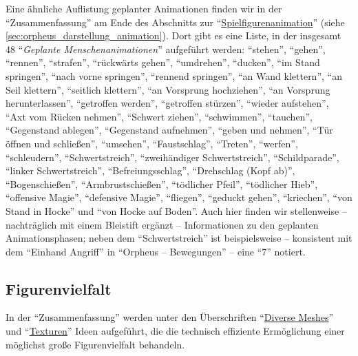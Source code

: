\documentclass[a5paper,pagesize,numbers=noenddot]{scrbook}
\begin{document}
Eine ähnliche Auflistung geplanter Animationen finden wir in der \enquote{Zusammenfassung} am Ende des Abschnitts zur \enquote{\uline{Spielfigurenanimation}} (siehe \autoref{sec:orpheus_darstellung_animation}).
Dort gibt es eine Liste, in der insgesamt 48 \enquote{\textit{Geplante Menschenanimationen}} aufgeführt werden:
\enquote{stehen}, \enquote{gehen}, \enquote{rennen}, \enquote{strafen}, \enquote{rückwärts gehen}, \enquote{umdrehen}, \enquote{ducken}, \enquote{im Stand springen}, \enquote{nach vorne springen}, \enquote{rennend springen}, \enquote{an Wand klettern}, \enquote{an Seil klettern}, \enquote{seitlich klettern}, \enquote{an Vorsprung hochziehen}, \enquote{an Vorsprung herunterlassen}, \enquote{getroffen werden}, \enquote{getroffen stürzen}, \enquote{wieder aufstehen}, \enquote{Axt vom Rücken nehmen}, \enquote{Schwert ziehen}, \enquote{schwimmen}, \enquote{tauchen}, \enquote{Gegenstand ablegen}, \enquote{Gegenstand aufnehmen}, \enquote{geben und nehmen}, \enquote{Tür öffnen und schließen}, \enquote{umsehen}, \enquote{Faustschlag}, \enquote{Treten}, \enquote{werfen}, \enquote{schleudern}, \enquote{Schwertstreich}, \enquote{zweihändiger Schwertstreich}, \enquote{Schildparade}, \enquote{linker Schwertstreich}, \enquote{Befreiungsschlag}, \enquote{Drehschlag (Kopf ab)}, \enquote{Bogenschießen}, \enquote{Armbrustschießen}, \enquote{tödlicher Pfeil}, \enquote{tödlicher Hieb}, \enquote{offensive Magie}, \enquote{defensive Magie}, \enquote{fliegen}, \enquote{geduckt gehen}, \enquote{kriechen}, \enquote{von Stand in Hocke} und \enquote{von Hocke auf Boden}.
Auch hier finden wir stellenweise -- nachträglich mit einem Bleistift ergänzt -- Informationen zu den geplanten Animationsphasen; neben dem \enquote{Schwertstreich} ist beispielsweise -- konsistent mit dem \enquote{Einhand Angriff} in \enquote{Orpheus -- Bewegungen} -- eine \enquote{7} notiert.


\subsection{Figurenvielfalt}\label{sec:orpheus_darstellung_figurenvielfalt}
In der \enquote{Zusammenfassung} werden unter den Überschriften \enquote{\uline{Diverse Meshes}} und \enquote{\uline{Texturen}} Ideen aufgeführt, die die technisch effiziente Ermöglichung einer möglichst große Figurenvielfalt behandeln.
\end{document}
